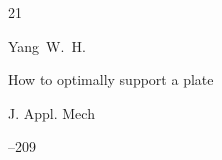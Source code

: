 \begin{thebibliography}{21}



















\by Yang~W.~H.

\paper How to optimally support a plate

\jour J. Appl. Mech




--209


















\end{thebibliography}
